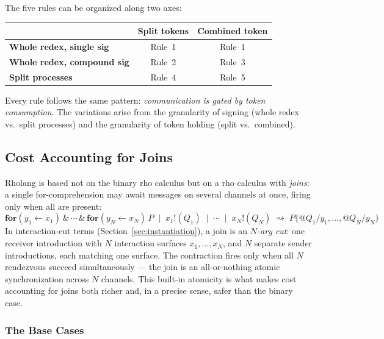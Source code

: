 \documentclass[11pt,a4paper]{article}
\makeatletter
\newcommand{\Par}{\mathbin{|}}
\newcommand{\forc}{\mathbf{for}}
\newcommand{\send}[2]{#1 !\!\left( #2 \right)}
\newcommand{\recv}[3]{\forc\!\left( #1 \leftarrow #2 \right) #3}
\newcommand{\quot}[1]{@#1}
\newcommand{\red}{\rightsquigarrow}
\makeatother
\begin{document}
The five rules can be organized along two axes:

\begin{center}
  \begin{tabular}{l|cc}
    & \textbf{Split tokens} & \textbf{Combined token} \\
    \midrule
    \textbf{Whole redex, single sig}
      & Rule~1 & Rule~1 \\
    \textbf{Whole redex, compound sig}
      & Rule~2 & Rule~3 \\
    \textbf{Split processes}
      & Rule~4 & Rule~5 \\
  \end{tabular}
\end{center}

\noindent
Every rule follows the same pattern: \emph{communication is
gated by token consumption}.  The variations arise from the
granularity of signing (whole redex vs.\ split processes) and
the granularity of token holding (split vs.\ combined).

\subsection{Cost Accounting for Joins}
\label{sec:joins}

Rholang is based not on the binary rho calculus but on a rho
calculus with \emph{joins}: a single for-comprehension may
await messages on several channels at once, firing only when
all are present:
\begin{equation}
  \recv{y_1}{x_1}{} \,\&\, \cdots \,\&\, \recv{y_N}{x_N}{}\,P
  \;\Par\; \send{x_1}{Q_1} \;\Par\; \cdots \;\Par\; \send{x_N}{Q_N}
  \;\red\;
  P\{\quot{Q_1}/y_1, \ldots, \quot{Q_N}/y_N\}
  \label{eq:join-rule}
\end{equation}
In interaction-cut terms (Section~\ref{sec:instantiation}), a
join is an \emph{$N$-ary cut}: one receiver introduction with
$N$ interaction surfaces $x_1, \ldots, x_N$, and $N$ separate
sender introductions, each matching one surface.  The
contraction fires only when all $N$ rendezvous succeed
simultaneously --- the join is an all-or-nothing atomic
synchronization across $N$ channels.  This built-in atomicity
is what makes cost accounting for joins both richer and, in a
precise sense, safer than the binary case.

\subsubsection{The Base Cases}
\end{document}
